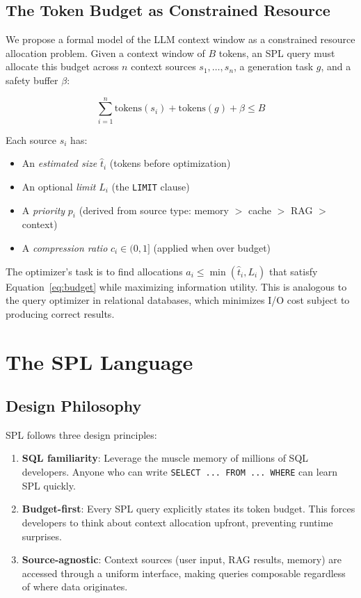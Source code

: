 \documentclass[11pt,a4paper]{article}
\begin{document}
\subsection{The Token Budget as Constrained Resource}

We propose a formal model of the LLM context window as a constrained resource allocation problem. Given a context window of $B$ tokens, an SPL query must allocate this budget across $n$ context sources $s_1, \ldots, s_n$, a generation task $g$, and a safety buffer $\beta$:

\begin{equation}
\label{eq:budget}
\sum_{i=1}^{n} \text{tokens}(s_i) + \text{tokens}(g) + \beta \leq B
\end{equation}

Each source $s_i$ has:
\begin{itemize}[nosep]
  \item An \emph{estimated size} $\hat{t}_i$ (tokens before optimization)
  \item An optional \emph{limit} $L_i$ (the \texttt{LIMIT} clause)
  \item A \emph{priority} $p_i$ (derived from source type: memory $>$ cache $>$ RAG $>$ context)
  \item A \emph{compression ratio} $c_i \in (0, 1]$ (applied when over budget)
\end{itemize}

The optimizer's task is to find allocations $a_i \leq \min(\hat{t}_i, L_i)$ that satisfy Equation~\ref{eq:budget} while maximizing information utility. This is analogous to the query optimizer in relational databases, which minimizes I/O cost subject to producing correct results.

\section{The SPL Language}
\label{sec:language}

\subsection{Design Philosophy}

SPL follows three design principles:

\begin{enumerate}[nosep]
  \item \textbf{SQL familiarity}: Leverage the muscle memory of millions of SQL developers. Anyone who can write \texttt{SELECT ... FROM ... WHERE} can learn SPL quickly.
  \item \textbf{Budget-first}: Every SPL query explicitly states its token budget. This forces developers to think about context allocation upfront, preventing runtime surprises.
  \item \textbf{Source-agnostic}: Context sources (user input, RAG results, memory) are accessed through a uniform interface, making queries composable regardless of where data originates.
\end{enumerate}
\end{document}
